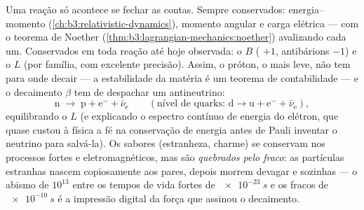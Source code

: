 \begin{proposition}\label{prop:b3:particle-physics:conservation}
Uma reação só acontece se fechar as contas. Sempre
conservados: energia--momento
(\cref{ch:b3:relativistic-dynamics}), momento angular e
carga elétrica --- com o teorema de Noether
(\cref{thm:b3:lagrangian-mechanics:noether}) avalizando cada um.
Conservados em toda reação até hoje observada: o \emph{}
$B$ ( $+1$, antibárions $-1$) e o \emph{}
$L$ (por família, com excelente precisão). Assim, o próton, o
 mais leve, não tem para onde decair --- a estabilidade da matéria
é um teorema de contabilidade --- e o decaimento $\beta$ tem de despachar
um antineutrino:
\[
\text{n} \;\to\; \text{p} + \text{e}^- + \bar\nu_{\text{e}}
\qquad (\text{nível de quarks: } \text{d} \to \text{u} +
\text{e}^- + \bar\nu_{\text{e}}) ,
\]
equilibrando o $L$ (e explicando o espectro contínuo de energia do
elétron, que quase custou à física a fé na conservação de
energia antes de Pauli inventar o neutrino para salvá-la).
Os sabores (estranheza, charme) se conservam nos processos fortes e
eletromagnéticos, mas são \emph{quebrados pelo fraco}: as partículas
estranhas nascem copiosamente aos pares, depois morrem devagar e sozinhas
--- o abismo de $10^{13}$ entre os tempos de vida fortes de
$\qty{e-23}{s}$ e os fracos de $\qty{e-10}{s}$ é a impressão digital da
força que assinou o decaimento.
\end{proposition}
\admitted

